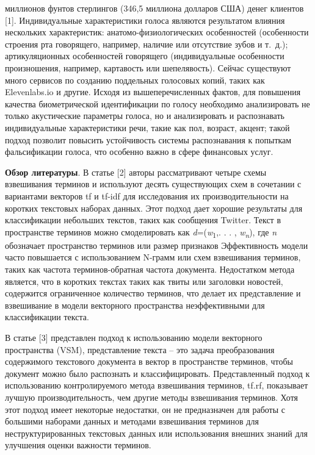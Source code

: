 \begin{multicols}{2}
миллионов фунтов стерлингов (346,5 миллиона долларов США) денег клиентов
{[}1{]}. Индивидуальные характеристики голоса являются результатом
влияния нескольких характеристик: анатомо-физиологических особенностей
(особенности строения рта говорящего, например, наличие или отсутствие
зубов и т.~д.); артикуляционных особенностей говорящего (индивидуальные
особенности произношения, например, картавость или шепелявость). Сейчас
существуют много сервисов по созданию поддельных голосовых копий, таких
как Elevenlabs.io и другие. Исходя из вышеперечисленных фактов, для
повышения качества биометрической идентификации по голосу необходимо
анализировать не только акустические параметры голоса, но и
анализировать и распознавать индивидуальные характеристики речи, такие
как пол, возраст, акцент; такой подход позволит повысить устойчивость
системы распознавания к попыткам фальсификации голоса, что особенно
важно в сфере финансовых услуг.

{\bfseries Обзор литературы}. В статье {[}2{]} авторы рассматривают четыре
схемы взвешивания терминов и используют десять существующих схем в
сочетании с вариантами векторов tf и tf-idf для исследования их
производительности на коротких текстовых наборах данных. Этот подход
дает хорошие результаты для классификации небольших текстов, таких как
сообщения Twitter. Текст в пространстве терминов можно смоделировать как
\emph{d}=(\emph{w}\textsubscript{1},. . . , \emph{w\textsubscript{n}}),
где \emph{n} обозначает пространство терминов или размер признаков
Эффективность модели часто повышается с использованием N-грамм или схем
взвешивания терминов, таких как частота терминов-обратная частота
документа. Недостатком метода является, что в коротких текстах таких как
твиты или заголовки новостей, содержится ограниченное количество
терминов, что делает их представление и взвешивание в модели векторного
пространства неэффективными для классификации текста.

В статье {[}3{]} представлен подход к использованию модели векторного
пространства (VSM), представление текста -- это задача преобразования
содержимого текстового документа в вектор в пространстве терминов, чтобы
документ можно было распознать и классифицировать. Представленный подход
к использованию контролируемого метода взвешивания терминов, tf.rf,
показывает лучшую производительность, чем другие методы взвешивания
терминов. Хотя этот подход имеет некоторые недостатки, он не
предназначен для работы с большими наборами данных и методами
взвешивания терминов для неструктурированных текстовых данных или
использования внешних знаний для улучшения оценки важности терминов.


\end{multicols}
